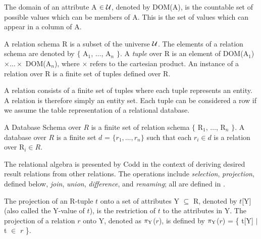 \begin{definition}
\begin{rm}
The domain of an attribute A $\in \cal U$, denoted by DOM(A), is the
countable set
of possible values which can be members of A.  This is the set
of values which can appear in a column of A.
\end{rm}
\end{definition}
\begin{definition}
\begin{rm}
A relation schema R is a subset of the universe $\cal U$.  The elements
of a relation schema are denoted by $\{$ A$_1$, $\ldots$, A$_n$ $\}$.
A {\em tuple} over R is an element of DOM(A$_1$) $\times \ldots \times$
DOM(A$_n$), where $\times$ refers to the cartesian product.  An instance
of a relation over R is a finite set of tuples defined over R.
\end{rm}
\end{definition}

A relation consists of a finite set of tuples where each tuple
represents an entity.  A relation is therefore simply an entity set. 
Each tuple can be considered a row if we assume
the table representation of a relational database.
\begin{definition}
\begin{rm}
A Database Schema over $R$ is a finite set of relation schema $\{$ R$_1$,
$\ldots$, R$_n$ $\}$.  A database over $R$ is a finite set $d$ = $\{ r_1,
\ldots, r_n \}$ such that each $r_i \in d$ is a relation over R$_i \in
R$.
\end{rm}
\end{definition}

The relational algebra is presented by Codd \cite{cod70} in the context of
deriving desired result relations from other relations.  The operations include
{\em selection}, {\em projection}, defined below, {\em join}, {\em
union}, {\em difference}, and
{\em renaming};  all are defined in
\cite{databasefound,atze93,Date95,Maier83,Ullm88}.
\begin{definition}[Projection]
\begin{rm}
The projection of an R-tuple $t$ onto a set of attributes Y $\subseteq$
R, denoted by $t[$Y$]$ (also called the Y-value of $t$), is the
restriction of $t$ to the attributes in Y.  The projection of a
relation $r$ onto Y, denoted as $\pi_{\rm Y}$($r$),
is defined by $\pi_{\rm Y}$($r$) = \{ t[Y] $\mid$ t $\in$ $r$ \}.
\end{rm}
\end{definition}

